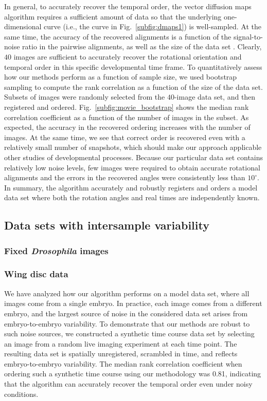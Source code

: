 \documentclass[twocolumn, 10pt]{article}
\newcommand{\fig}[0]{Fig.}
\begin{document}
In general, to accurately recover the temporal order, the vector diffusion maps algorithm requires a sufficient amount of data so that the underlying one-dimensional curve (i.e., the curve in \fig~\ref{subfig:dmaps1}) is well-sampled.
%
At the same time, the accuracy of the recovered alignments is a function of the signal-to-noise ratio in the pairwise alignments, as well as the size of the data set \citep{singer2011angular}.
%
Clearly, $40$ images are sufficient to accurately recover the rotational orientation and temporal order in this specific developmental time frame.
%
To quantitatively assess how our methods perform as a function of sample size, we used bootstrap sampling to compute the rank correlation as a function of the size of the data set.
%
Subsets of images were randomly selected from the $40$-image data set, and then registered and ordered. 
%
\fig~\ref{subfig:movie_bootstrap} shows the median rank correlation coefficient as a function of the number of images in the subset.
%
As expected, the accuracy in the recovered ordering increases with the number of images. 
% 
At the same time, we see that correct order is recovered even with a relatively small number of snapshots, which should make our approach applicable other studies of developmental processes.
%
Because our particular data set contains relatively low noise levels, few images were required to obtain accurate rotational alignments and the errors in the recovered angles were consistently less than $10^{\circ}$.
%
In summary, the algorithm accurately and robustly registers and orders a model data set where both the rotation angles and real times are independently known. 


\subsection*{Data sets with intersample variability}

\subsubsection*{Fixed {\em Drosophila} images}

\subsubsection*{Wing disc data}

We have analyzed how our algorithm performs on a model data set, where all images come from a single embryo. 
%
In practice, each image comes from a different embryo, and the largest source of noise in the considered data set arises from embryo-to-embryo variability.
%
To demonstrate that our methods are robust to such noise sources,
we constructed a synthetic time course data set by selecting an image from a random live imaging experiment at each time point.
%
The resulting data set is spatially unregistered, scrambled in time, and reflects embryo-to-embryo variability. 
%
The median rank correlation coefficient when ordering such a synthetic time course using our methodology was 0.81, indicating that the algorithm can accurately recover the temporal order even under noisy conditions. 
\end{document}
